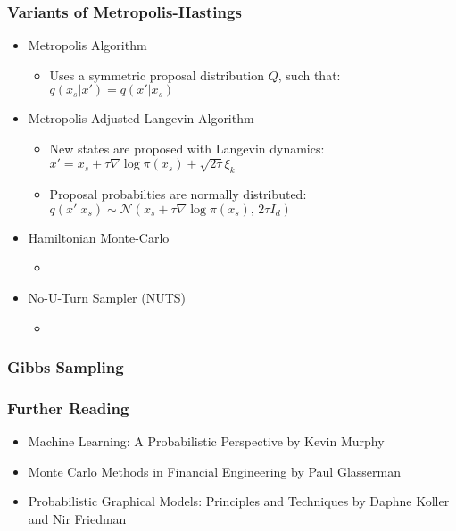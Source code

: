 \documentclass{beamer}
\begin{document}
\begin{frame}
\frametitle{Variants of Metropolis-Hastings}
\begin{itemize}
  \item Metropolis Algorithm
  \begin{itemize}
    \item Uses a symmetric proposal distribution $Q$, such that: \\
     $q(x_s|x') = q(x'|x_s)$
  \end{itemize}
  \item Metropolis-Adjusted Langevin Algorithm
  \begin{itemize}
    \item New states are proposed with Langevin dynamics: \\
      $x' = x_s + \tau \nabla \log \pi(x_s) + \sqrt{2 \tau} \xi_k$
    \item Proposal probabilties are normally distributed: \\
      $q(x'| x_s) \sim \mathcal{N}(x_s + \tau \nabla \log \pi(x_s), \, 2 \tau  I_d)$
  \end{itemize}
  \item Hamiltonian Monte-Carlo
  \begin{itemize}
    \item
  \end{itemize}
  \item No-U-Turn Sampler (NUTS)
  \begin{itemize}
    \item
  \end{itemize}
\end{itemize}
\end{frame}




\begin{frame}
\frametitle{Gibbs Sampling}
\end{frame}



\begin{frame}
\frametitle{Further Reading}
  \begin{itemize}
    \item Machine Learning: A Probabilistic Perspective by Kevin Murphy
    \item Monte Carlo Methods in Financial Engineering by Paul Glasserman
    \item Probabilistic Graphical Models: Principles and Techniques by Daphne Koller and Nir Friedman
  \end{itemize}
\end{frame}



\end{document}
